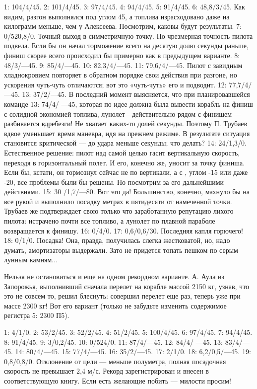 \documentclass[11pt,a4paper,oneside]{article}
\begin{document}
1: 104/4/45. 2: 101/4/45. 3: 97/4/45. 4: 94/4/45. 5: 91/4/45. 6: 48,8/3/45. Как видим, разгон выполнялся под углом 45\degree, а топлива израсходовано даже на килограмм меньше, чем у Алексеева. Посмотрим, каковы будут результаты. 7: 0/520,8/0. Точный выход в симметричную точку. Но чрезмерная точность пилота подвела. Если бы он начал торможение всего на десятую долю секунды раньше, финиш скорее всего происходил бы примерно как в предыдущем варианте. 8: 48/3/—45. 9: 85/4/—45. 10: 82,3/4/—45. 11: 79,6/4/—45. Пилот с завидным хладнокровием повторяет в обратном порядке свои действия при разгоне, но ускорения чуть-чуть отличаются; вот это «чуть-чуть» его и подводит. 12: 77,7/4/—45. 13: 37/2/—45. В последний момент выясняется, что при планировавшейся команде 13: 74/4/ —45, которая по идее должна была вывести корабль на финиш с солидной экономией топлива, лунолет—действительно рядом с финишем — разбивается вдребезги! Не хватает каких-то долей секунды. Поэтому П. Трубаев вдвое уменьшает время маневра, идя на прежнем режиме. В результате ситуация становится критической — до удара меньше секунды; что делать? 14: 24/1,3/0. Естественное решение: пилот над самой целью гасит вертикальную скорость, переходя в горизонтальный полет. И его, конечно же, уносит за точку финиша. Если бы, кстати, он тормознул сейчас не по вертикали, а с , углом -15 или даже -20\degree, все проблемы были бы решены. Но посмотрим за его дальнейшими действиями. 15: 30 /1,7/—80. Вот это да! Большинство, конечно, махнуло бы на все рукой и выполнило посадку метрах в пятидесяти от намеченной точки. Трубаев же подтверждает свою только что заработанную репутацию лихого пилота: истрачено почти все топливо, а лунолет по плавной параболе возвращается к финишу. 16: 0/4/0. 17: 0,6/0,6/30. Последняя капля горючего! 18: 0/1/0. Посадка! Она, правда, получилась слегка жестковатой, но, надо думать, амортизаторы выдержали. Зато не придется топать пешком по серым лунным камням...

Нельзя не остановиться и еще на одном рекордном варианте. А. Аула из Запорожья, выполнивший сначала перелет на корабле массой 2150 кг, узнав, что это не совсем то, решил блеснуть: совершил перелет еще раз, теперь уже при массе 2300 кг! Вот его вариант (только не забудьте изменить содержимое регистра 5: 2300 П5).

1: 4/1/0. 2: 53/2/45. 3: 52/2/45. 4: 51/2/45. 5: 100/4/45. 6: 97/4/45. 7: 94/4/45. 8: 91/4/45. 9: 3/0,2/45. 10: 0/524/0. 11: 87/4/—45. 12: 84/4/ —45.	13: 83/4/—45.	14: 80/4/—45. 15: 77/4/—45. 16: 35/2/—45. 17: 2/1/0. 18: 6,2/0,5/—45. 19: 0,8/0,8/0. Отклонение от цели — меньше полуметра, полная посадочная скорость не превышает 2,4 м/с. Рекорд зарегистрирован и внесен в соответствующую книгу. Если есть желающие побить — милости просим!
\end{document}
